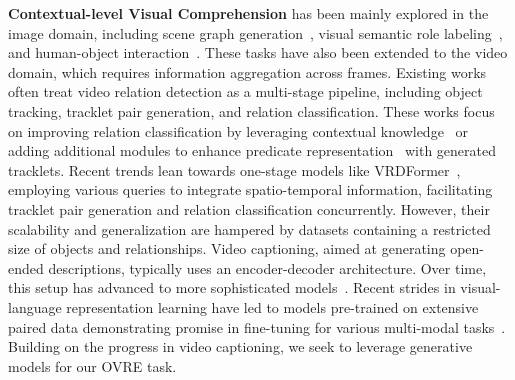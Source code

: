 \documentclass[letterpaper]{article}
\begin{document}
\noindent \textbf{Contextual-level Visual Comprehension} has been mainly explored in the image domain, including scene graph generation~\cite{genome}, visual semantic role labeling~\cite{yatskar2016situation, sadhu2021visual}, and human-object interaction~\cite{li2022hake, gkioxari2018detecting}. These tasks have also been extended to the video domain, which requires information aggregation across frames.
Existing works often treat video relation detection as a multi-stage pipeline, including object tracking, tracklet pair generation, and relation classification. These works focus on improving relation classification by leveraging contextual knowledge~\cite{10.1145/3343031.3351058} or adding additional modules to enhance predicate representation~\cite{gao2021video} with generated tracklets.
Recent trends lean towards one-stage models like VRDFormer~\cite{zheng2022vrdformer}, employing various queries to integrate spatio-temporal information, facilitating tracklet pair generation and relation classification concurrently.
However, their scalability and generalization are hampered by datasets containing a restricted size of objects and relationships.
Video captioning, aimed at generating open-ended descriptions, typically uses an encoder-decoder architecture. Over time, this setup has advanced to more sophisticated models~\cite{zhang2019reconstruct,tang2021clip4caption,lin2022swinbert}. %
Recent strides in visual-language representation learning have led to models pre-trained on extensive paired data demonstrating promise in fine-tuning for various multi-modal tasks~\cite{wang2022git,xu2023mplug2,chen2023valor}.
Building on the progress in video captioning, we seek to leverage generative models for our OVRE task.
\end{document}
